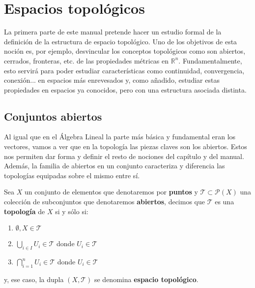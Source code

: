 \chapter{Espacios topológicos}
\label{cha:espacios_topologicos}
La primera parte de este manual pretende hacer un estudio formal de la definición de la estructura de espacio topológico. Uno de los objetivos de esta noción es, por ejemplo, desvincular los conceptos topológicos como son abiertos, cerrados, fronteras, etc. de las propiedades métricas en $\mathbb{R}^n$. Fundamentalmente, esto servirá para poder estudiar características como continuidad, convergencia, conexión... en espacios más enrevesados y, como añadido, estudiar estas propiedades en espacios ya conocidos, pero con una estructura asociada distinta.

\section{Conjuntos abiertos}
\label{sec:conjuntos_abiertos}
Al igual que en el Álgebra Lineal la parte más básica y fundamental eran los vectores, vamos a ver que en la topología las piezas claves son los abiertos. Estos nos permiten dar forma y definir el resto de nociones del capítulo y del manual. Además, la familia de abiertos en un conjunto caracteriza y diferencia las topologías equipadas sobre el mismo entre sí.

\begin{defi}
Sea $X$ un conjunto de elementos que denotaremos por \textbf{puntos} y $\mathcal{T} \subset \mathcal{P}\left( X \right)$ una colección de subconjuntos que denotaremos \textbf{abiertos}, decimos que $\mathcal{T}$ es una \textbf{topología} de $X$ si y sólo si:
\begin{enumerate}
    \item $\emptyset, X \in \mathcal{T}$ 
    \item $\bigcup_{i \in I} U_i \in \mathcal{T}$ donde $U_i \in \mathcal{T}$
    \item $\bigcap_{i=1}^n U_i \in \mathcal{T}$ donde $U_i \in \mathcal{T}$
\end{enumerate}
y, ese caso, la dupla $\left( X, \mathcal{T} \right)$ se denomina \textbf{espacio topológico}.
\end{defi}

